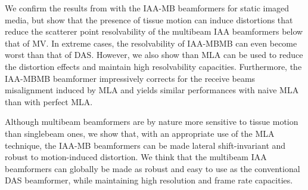 We confirm the results from \cite{Jensen_IAA} with the IAA-MB beamformers for static imaged media, but show that the presence of tissue motion can induce distortions that reduce the scatterer point resolvability of the multibeam IAA beamformers below that of MV.
In extreme cases, the resolvability of IAA-MBMB can even become worst than that of DAS.
However, we also show than MLA can be used to reduce the distortion effects and maintain high resolvability capacities.
Furthermore, the IAA-MBMB beamformer impressively corrects for the receive beams misalignment induced by MLA and yields similar performances with naive MLA than with perfect MLA.

Although multibeam beamformers are by nature more sensitive to tissue motion than singlebeam ones, we show that, with an appropriate use of the MLA technique, the IAA-MB beamformers can be made lateral shift-invariant and robust to motion-induced distortion.
We think that the multibeam IAA beamformers can globally be made as robust and easy to use as the conventional DAS beamformer, while maintaining high resolution and frame rate capacities.

